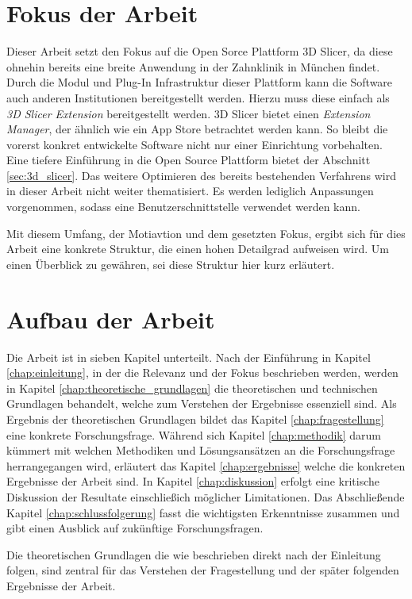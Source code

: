 \section{Fokus der Arbeit}
\label{sec:fokus_der-arbeit} Dieser Arbeit setzt den Fokus auf die Open Sorce
Plattform 3D Slicer, da diese ohnehin bereits eine breite Anwendung in der Zahnklinik
in München findet. Durch die Modul und Plug-In Infrastruktur dieser Plattform
kann die Software auch anderen Institutionen bereitgestellt werden. Hierzu muss diese
einfach als \textit{3D Slicer Extension} bereitgestellt werden. 3D Slicer bietet
einen \textit{Extension Manager}, der ähnlich wie ein App Store betrachtet werden
kann. So bleibt die vorerst konkret entwickelte Software nicht nur einer
Einrichtung vorbehalten. Eine tiefere Einführung in die Open Source Plattform bietet
der Abschnitt \ref{sec:3d_slicer}. Das weitere Optimieren des bereits
bestehenden Verfahrens wird in dieser Arbeit nicht weiter thematisiert. Es werden
lediglich Anpassungen vorgenommen, sodass eine Benutzerschnittstelle verwendet
werden kann.

Mit diesem Umfang, der Motiavtion und dem gesetzten Fokus, ergibt sich für dies
Arbeit eine konkrete Struktur, die einen hohen Detailgrad aufweisen wird. Um
einen Überblick zu gewähren, sei diese Struktur hier kurz erläutert.

\section{Aufbau der Arbeit}
\label{sec:aufbau_der_arbeit} Die Arbeit ist in sieben Kapitel unterteilt. Nach
der Einführung in Kapitel \ref{chap:einleitung}, in der die Relevanz und der Fokus
beschrieben werden, werden in Kapitel \ref{chap:theoretische_grundlagen} die
theoretischen und technischen Grundlagen behandelt, welche zum Verstehen der Ergebnisse
essenziell sind. Als Ergebnis der theoretischen Grundlagen bildet das Kapitel
\ref{chap:fragestellung} eine konkrete Forschungsfrage. Während sich Kapitel \ref{chap:methodik}
darum kümmert mit welchen Methodiken und Lösungsansätzen an die Forschungsfrage herrangegangen
wird, erläutert das Kapitel \ref{chap:ergebnisse} welche die konkreten
Ergebnisse der Arbeit sind. In Kapitel \ref{chap:diskussion} erfolgt eine kritische
Diskussion der Resultate einschließich möglicher Limitationen. Das Abschließende
Kapitel \ref{chap:schlussfolgerung} fasst die wichtigsten Erkenntnisse zusammen
und gibt einen Ausblick auf zukünftige Forschungsfragen.

Die theoretischen Grundlagen die wie beschrieben direkt nach der Einleitung
folgen, sind zentral für das Verstehen der Fragestellung und der später folgenden
Ergebnisse der Arbeit.
